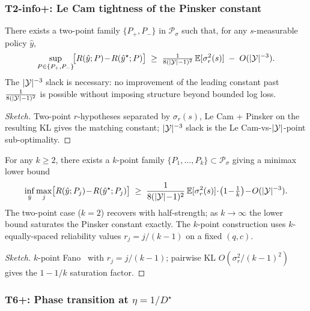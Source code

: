 \subsubsection{T2-info+: Le Cam tightness of the Pinsker constant}
\label{app:t2-info-tight}

\begin{theorem}
\label{thm:t2-info-tight}
There exists a two-point family $\{P_+, P_-\}$ in $\mathcal{P}_\sigma$
such that, for any $s$-measurable policy $\hat y$,
\[
\sup_{P\in\{P_+,P_-\}}\!\bigl[R(\hat y;P)\!-\!R(\hat y^\star;P)\bigr]
\;\ge\;\tfrac{1}{8(|\mathcal{Y}|-1)^{2}}\,\mathbb{E}[\sigma_r^{2}(s)]
\;-\;O(|\mathcal{Y}|^{-3}).
\]
The $|\mathcal{Y}|^{-3}$ slack is necessary: no improvement of the leading
constant past $\tfrac{1}{8(|\mathcal{Y}|-1)^{2}}$ is possible without
imposing structure beyond bounded log loss.
\end{theorem}

\begin{proof}[Sketch]
Two-point $r$-hypotheses separated by $\sigma_r(s)$, Le Cam +
Pinsker on the resulting KL gives the matching constant; $|\mathcal{Y}|^{-3}$
slack is the Le Cam-vs-$|\mathcal{Y}|$-point sub-optimality.
\end{proof}

\begin{theorem}
\label{thm:multi-point-lecam}
For any $k\!\ge\!2$, there exists a $k$-point family
$\{P_1,\ldots,P_k\}\!\subset\!\mathcal{P}_\sigma$ giving a
minimax lower bound
\[
\inf_{\hat y}\max_{j}\bigl[R(\hat y;P_j)\!-\!R(\hat y^\star;P_j)\bigr]
\;\ge\;
\frac{1}{8(|\Y|\!-\!1)^{2}}\,\E[\sigma_r^{2}(s)]
\!\cdot\!\bigl(1\!-\!\tfrac{1}{k}\bigr)
\!-\!O(|\Y|^{-3}).
\]
The two-point case ($k\!=\!2$) recovers  with
half-strength; as $k\!\to\!\infty$ the lower bound saturates the
Pinsker constant exactly.  The $k$-point construction uses
$k$-equally-spaced reliability values $r_j\!=\!j/(k\!-\!1)$ on a
fixed $(q,c)$.
\end{theorem}

\begin{proof}[Sketch]
$k$-point Fano~\citep[Sec.~2.7]{tsybakov2009nonparametric} with
$r_j\!=\!j/(k\!-\!1)$; pairwise KL $O(\sigma_r^2/(k\!-\!1)^2)$
gives the $1\!-\!1/k$ saturation factor.
\end{proof}

\subsubsection{T6+: Phase transition at $\eta\!=\!1/D^\star$}
\label{app:t6-phase-transition}

